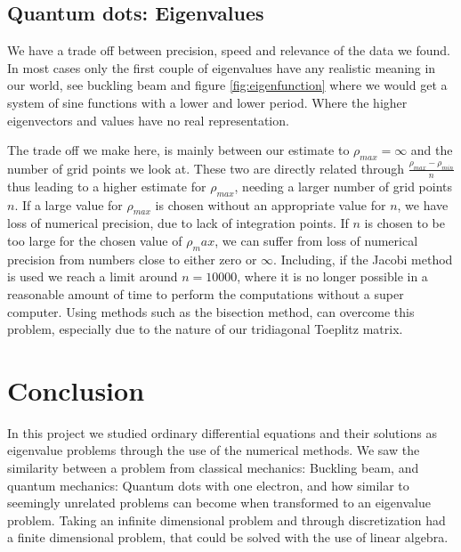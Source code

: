 \documentclass[%
reprint,
nofootinbib,
amsmath,amssymb,
aps,
]{revtex4-1}
\begin{document}
\subsection{Quantum dots: Eigenvalues}%
We have a trade off between precision, speed and relevance of the data we found. In most cases only the first couple of eigenvalues have any realistic meaning in our world, see buckling beam and figure \ref{fig:eigenfunction} where we would get a system of sine functions with a lower and lower period. Where the higher eigenvectors and values have no real representation. 

The trade off we make here, is mainly between our estimate to $\rho_{max} = \infty$ and the number of grid points we look at. These two are directly related through $\frac{\rho_{max}-\rho_{min}}{n}$ thus leading to a higher estimate for $\rho_{max}$, needing a larger number of grid points $n$. If a large value for $\rho_{max}$ is chosen without an appropriate value for $n$, we have loss of numerical precision, due to lack of integration points. If $n$ is chosen to be too large for the chosen value of $\rho_max$, we can suffer from loss of numerical precision from numbers close to either zero or $\infty$. Including, if the Jacobi method is used we reach a limit around $n = 10000$, where it is no longer possible in a reasonable amount of time to perform the computations without a super computer. Using methods such as the bisection method, can overcome this problem, especially due to the nature of our tridiagonal  Toeplitz matrix\cite{GoluVanlBisection}. 

\section{Conclusion}%
In this project we studied ordinary differential equations and their solutions as eigenvalue problems through the use of the numerical methods. We saw the similarity between a problem from classical mechanics: Buckling beam, and quantum mechanics: Quantum dots with one electron, and how similar to seemingly unrelated problems can become when transformed to an eigenvalue problem. Taking an infinite dimensional problem and through discretization had a finite dimensional problem, that could be solved with the use of linear algebra. 
\end{document}
